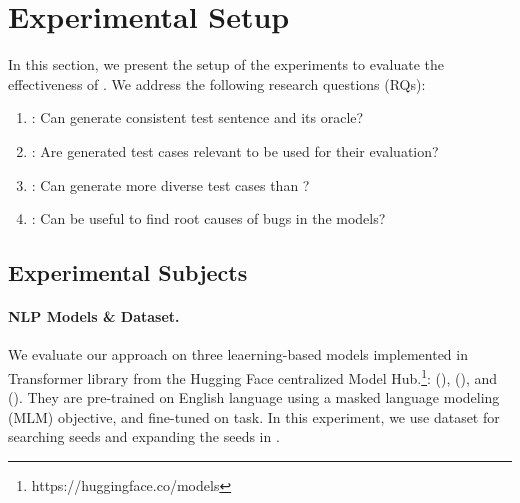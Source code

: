 \section{Experimental Setup}
\label{sec:experiment}
%
In this section, we present the setup of the experiments to evaluate
the effectiveness of \tool{}. We address the following research
questions (RQs):


\begin{enumerate}[label=\textbf{RQ\arabic*}]
\item \label{rq:one}: Can \tool generate consistent test sentence and
  its oracle?
\item \label{rq:two}: Are \tool generated test cases relevant to be used
  for their \lc evaluation?
\item \label{rq:three}: Can \tool generate more diverse test cases
  than \Cklst?
\item \label{rq:four}: Can \tool be useful to find root causes of bugs
  in the \sa models?
\end{enumerate}





\subsection{Experimental Subjects}

\paragraph{\textbf{NLP Models \& Dataset.}}
We evaluate our approach on three leaerning-based \sa models
implemented in Transformer library from the Hugging Face centralized
Model Hub.\footnote{https://huggingface.co/models}: \texttt{\Bert}
(\bertsamodel), \texttt{\Roberta} (\robertasamodel), and
\texttt{\Dbert} (\disbertsamodel). They are pre-trained on English
language using a masked language modeling (MLM) objective, and
fine-tuned on \sa task. In this experiment, we use \Sstt dataset for
searching seeds and expanding the seeds in \tool.

